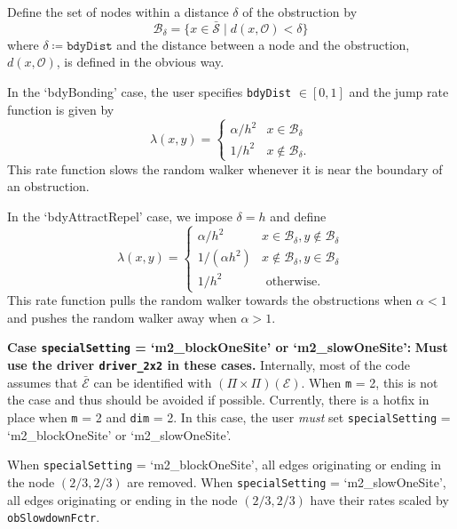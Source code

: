 \documentclass[11pt, oneside]{article}   	%
\theoremstyle{definition}
\newcommand\sS{\mathcal{S}}
\newcommand\sE{\mathcal{E}}
\newcommand\oS{\bar{\sS}}
\newcommand\oE{\bar{\sE}}
\begin{document}
Define the set of nodes within a distance $\delta$ of the obstruction by
\begin{equation}\label{eqn:bdy-nodes}
\mathcal{B}_{\delta} = \{x \in \oS \;|\; d(x,\mathcal{O}) < \delta\}
\end{equation}
where $\delta \coloneqq \texttt{bdyDist}$ and the distance between a node and the obstruction, $d(x,\mathcal{O})$, is defined in the obvious way.

In the `bdyBonding' case, the user specifies \texttt{bdyDist} $\in [0,1]$ and the jump rate function is given by
\begin{equation}\label{eqn:rate-bdyBonding}
	\lambda(x,y) =
	\begin{cases}
		 \alpha/h^2 & x \in \mathcal{B}_{\delta} \\
		 1/h^2 & x \notin \mathcal{B}_{\delta}.
	\end{cases}
\end{equation}
This rate function slows the random walker whenever it is near the boundary of an obstruction.

In the `bdyAttractRepel' case, we impose $\delta = h$ and define
\begin{equation}\label{eqn:rate-bdyAttractRepel}
	\lambda(x,y) =
	\begin{cases}
		 \alpha / h^2 & x \in \mathcal{B}_{\delta}, y \notin \mathcal{B}_{\delta}\\
		 1 / (\alpha h^2) & x \notin \mathcal{B}_{\delta}, y \in \mathcal{B}_{\delta} \\
		 1/h^2 & \text{ otherwise.}
	\end{cases}
\end{equation}
This rate function pulls the random walker towards the obstructions when $\alpha < 1$ and pushes the random walker away when $\alpha > 1$.

{\bf Case \texttt{specialSetting} = `m2\_blockOneSite' or `m2\_slowOneSite':}
{\bf Must use the driver \texttt{driver\_2x2} in these cases.} Internally, most of the code assumes that $\oE$ can be identified with $(\Pi \times \Pi)(\sE)$. When \texttt{m} = 2, this is not the case and thus should be avoided if possible. Currently, there is a hotfix in place when \texttt{m} = 2 and \texttt{dim} = 2. In this case, the user \emph{must} set \texttt{specialSetting} = `m2\_blockOneSite' or `m2\_slowOneSite'.

When \texttt{specialSetting} = `m2\_blockOneSite', all edges originating or ending in the node $(2/3,2/3)$ are removed. When \texttt{specialSetting} = `m2\_slowOneSite', all edges originating or ending in the node $(2/3,2/3)$ have their rates scaled by \texttt{obSlowdownFctr}.
\end{document}
